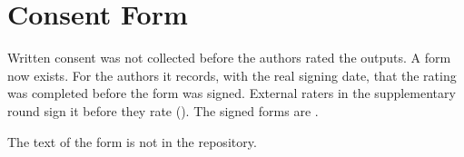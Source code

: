 \chapter{Consent Form}
\label{app:E}
\label{app:consent}

Written consent was not collected before the authors rated the outputs. A form now exists. For the authors it records, with the real signing date, that the rating was completed before the form was signed. External raters in the supplementary round sign it before they rate (). The signed forms are \PENDINGCONSENT{}.

The text of the form is not in the repository.


